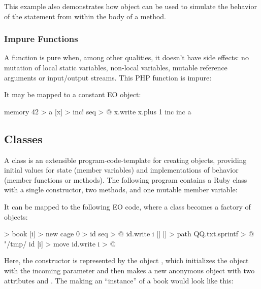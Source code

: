 \documentclass[sigplan,11pt,nonacm,natbib=false]{acmart}
\begin{document}
This example also demonstrates how  object can be used to simulate the behavior of the  statement from within the body of a method.

\subsubsection{Impure Functions}

A function is pure when, among other qualities, it doesn't have side effects:
no mutation of local static variables, non-local variables, mutable reference arguments
or input/output streams. This PHP function is impure:


It may be mapped to a constant EO object:

\begin{ffcode}
memory 42 > a
[x] > inc!
  seq > @
    x.write
      x.plus 1
inc
  inc a
\end{ffcode}

\subsection{Classes}
\label{sec:classes}

A class is an extensible program-code-template for creating objects, providing initial values for state (member variables) and implementations of behavior (member functions or methods). The following program contains a Ruby class with a single constructor, two methods, and one mutable member variable:


It can be mapped to the following EO code, where a class becomes a factory of objects:

\begin{ffcode}
[] > book
  [i] > new
    cage 0 > id
    seq > @
      id.write i
      []
        [] > path
          QQ.txt.sprintf > @
            "/tmp/%
            id
        [i] > move
          id.write i > @
\end{ffcode}

Here, the constructor is represented by the object , which initializes the object  with the incoming parameter  and then makes a new anonymous object with two attributes  and . The making an ``instance'' of a book would look like this:
\end{document}
